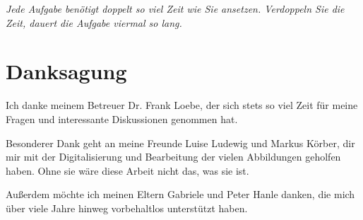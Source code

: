 
\begin{flushright}{\slshape
    Jede Aufgabe benötigt doppelt so viel Zeit wie Sie ansetzen. Verdoppeln Sie die Zeit, dauert die Aufgabe viermal so lang. }%
\end{flushright}



\bigskip

\begingroup
\let\clearpage\relax
\let\cleardoublepage\relax
\let\cleardoublepage\relax
\chapter*{Danksagung}

Ich danke meinem Betreuer Dr. Frank Loebe, der sich stets so viel Zeit für meine Fragen und interessante Diskussionen genommen hat.

Besonderer Dank geht an meine Freunde Luise Ludewig und Markus Körber, dir mir mit der Digitalisierung und Bearbeitung der vielen Abbildungen geholfen haben. Ohne sie wäre diese Arbeit nicht das, was sie ist.

Außerdem möchte ich meinen Eltern Gabriele und Peter Hanle danken, die mich über viele Jahre hinweg vorbehaltlos unterstützt haben.


\endgroup
